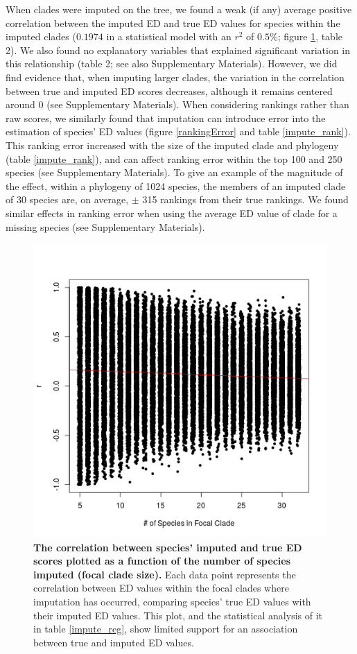 \documentclass[10pt,english]{article}
\begin{document}
When clades were imputed on the tree, we found a weak (if any) average positive correlation
between the imputed ED and true ED values for species within the imputed clades
($0.1974$ in a statistical model with an $r^2$ of $0.5\%$; figure \ref{imputationTrend}, table 2).
We also found no explanatory variables that explained significant variation in
this relationship (table 2; see also Supplementary Materials). However, we did
find evidence that, when imputing larger clades, the variation in the
correlation between true and imputed ED scores decreases, although it remains
centered around 0 (see Supplementary Materials). When considering rankings
rather than raw scores, we similarly found that imputation can introduce error
into the estimation of species' ED values (figure \ref{rankingError} and table \ref{impute_rank}). This ranking error
increased with the size of the imputed clade and phylogeny (table \ref{impute_rank}), and can
affect ranking error within the top 100 and 250 species (see Supplementary
Materials). To give an example of the magnitude of the effect, within a
phylogeny of 1024 species, the members of an imputed clade of 30 species are, on
average, $\pm$ 315 rankings from their true rankings.
We found similar effects in ranking error when using the average
ED value of clade for a missing species (see Supplementary Materials).

\begin{figure}[!ht]
  \center
  \includegraphics[width=.5\textwidth]{edModel.png}
  \caption{\textbf{The correlation between species' imputed and true
      ED scores plotted as a function of the number of species imputed
      (focal clade size).} Each data point represents the correlation
    between ED values within the focal clades where imputation has
    occurred, comparing species' true ED values with their imputed ED
    values. This plot, and the statistical analysis of it in table
    \ref{impute_reg}, show limited support for an association between
    true and imputed ED values.}
  \label{imputationTrend}
\end{figure}
\end{document}
